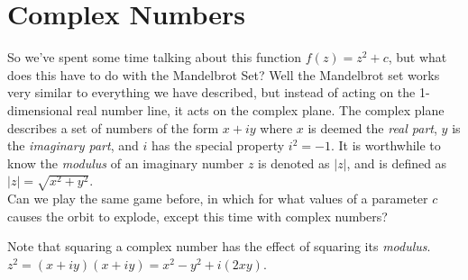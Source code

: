 \documentclass[20pt]{article} %
\begin{document}
\section{Complex Numbers}
So we've spent some time talking about this function $f(z)=z^{2}+c$, but what does this have to do with the Mandelbrot Set? Well the Mandelbrot set works very similar to everything we have described, but instead of acting on the 1-dimensional real number line, it acts on the complex plane.  The complex plane describes a set of numbers of the form $x + iy$ where $x$ is deemed the \textit{real part}, $y$ is the \textit{imaginary part}, and $i$ has the special property $i^{2}=-1$.  It is worthwhile to know the \textit{modulus} of an imaginary number $z$ is denoted as $|z|$, and is defined as $|z|=\sqrt{x^{2}+y^{2}}$. \\

Can we play the same game before, in which for what values of a parameter $c$ causes the orbit to explode, except this time with complex numbers?  

Note that squaring a complex number has the effect of squaring its \textit{modulus}. $z^{2} = (x+iy)(x+iy)=x^{2}-y^{2}+i(2xy)$.
\end{document}
